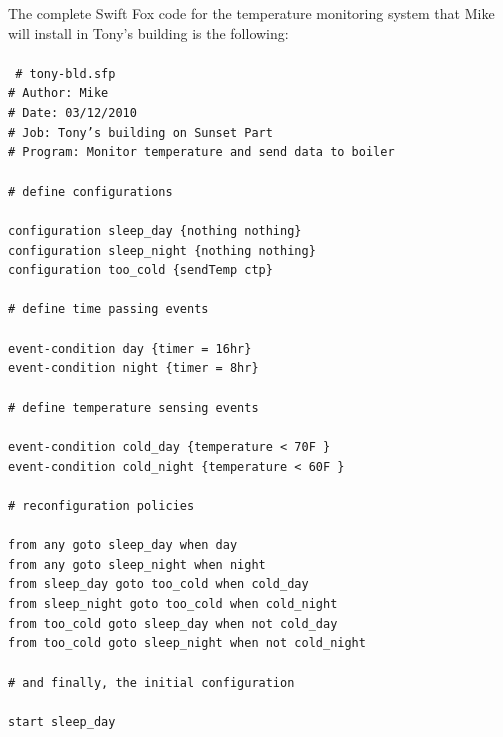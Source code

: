 \newpage
The complete Swift Fox code for the temperature monitoring system that Mike
will install in Tony's building is the following:			\\
\\
\texttt{
\# tony-bld.sfp								\\
\# Author:   Mike							\\
\# Date:  03/12/2010							\\
\# Job:  Tony's building on Sunset Part					\\
\# Program:  Monitor temperature and send data to boiler 		\\
\\
\# define configurations 						\\
\\
configuration sleep\_day \{nothing nothing\} 				\\
configuration sleep\_night \{nothing nothing\}				\\
configuration too\_cold \{sendTemp ctp\}				\\
\\
\# define time passing events						\\
\\
event-condition day \{timer = 16hr\} 					\\
event-condition night \{timer = 8hr\}					\\
\\
\# define temperature sensing events					\\
\\
event-condition cold\_day \{temperature < 70F \}			\\
event-condition cold\_night \{temperature < 60F \}			\\
\\
\# reconfiguration policies						\\
\\
from any goto sleep\_day when day					\\
from any goto sleep\_night when night					\\
from sleep\_day goto too\_cold when cold\_day				\\
from sleep\_night goto too\_cold when cold\_night			\\
from too\_cold goto sleep\_day when not cold\_day			\\
from too\_cold goto sleep\_night when not cold\_night			\\
\\
\# and finally, the initial configuration				\\
\\
start sleep\_day							\\
}

